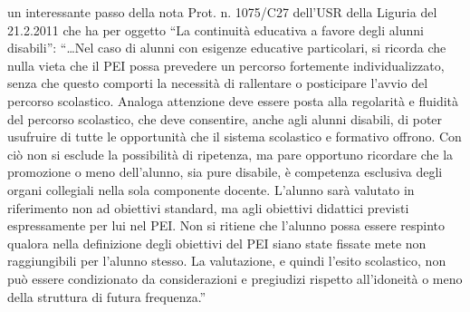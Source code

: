  un interessante passo della nota Prot. n. 1075/C27 dell’USR della Liguria del 21.2.2011 che ha per oggetto “La continuità educativa a favore degli alunni disabili”:
“…Nel caso di alunni con esigenze educative particolari, si ricorda che nulla vieta che il PEI possa prevedere un percorso fortemente individualizzato, senza che questo comporti la necessità di
rallentare o posticipare l'avvio del percorso scolastico. Analoga attenzione deve essere posta alla regolarità e fluidità del percorso scolastico, che deve consentire, anche agli alunni disabili, di poter usufruire di tutte le opportunità che il sistema scolastico e formativo offrono. Con ciò non si esclude la possibilità di ripetenza, ma pare opportuno ricordare che la promozione o meno dell'alunno, sia pure disabile, è competenza esclusiva degli organi collegiali nella sola componente docente.
L'alunno sarà valutato in riferimento non ad obiettivi standard, ma agli obiettivi didattici previsti espressamente per lui nel PEI. Non si ritiene che l'alunno possa essere respinto qualora nella definizione degli obiettivi del PEI siano state fissate mete non raggiungibili per l'alunno stesso.
La valutazione, e quindi l'esito scolastico, non può essere condizionato da considerazioni e pregiudizi rispetto all'idoneità o meno della struttura di futura frequenza.”